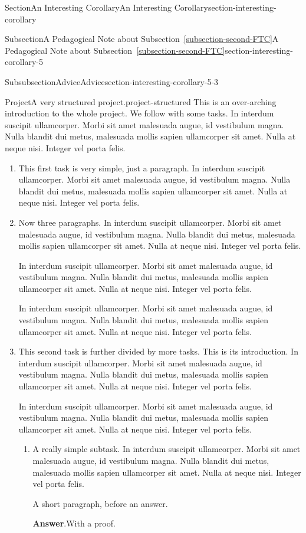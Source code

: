 \documentclass[twoside,10pt,]{article}
\newcommand{\blocktitlefont}{\relax}
\newcommand{\xreffont}{\relax}
\numberwithin{equation}{section}
\begin{document}
\begin{sectionptx}{Section}{An Interesting Corollary}{}{An Interesting Corollary}{}{}{section-interesting-corollary}
\begin{subsectionptx}{Subsection}{A Pedagogical Note about Subsection~{\xreffont\ref*{subsection-second-FTC}}}{}{A Pedagogical Note about Subsection~{\xreffont\ref*{subsection-second-FTC}}}{}{}{section-interesting-corollary-5}
\begin{subsubsectionptx}{Subsubsection}{Advice}{}{Advice}{}{}{section-interesting-corollary-5-3}
\begin{project}{Project}{A very structured project.}{project-structured}
This is an over-arching introduction to the whole project.  We follow with some tasks.  In interdum suscipit ullamcorper. Morbi sit amet malesuada augue, id vestibulum magna. Nulla blandit dui metus, malesuada mollis sapien ullamcorper sit amet. Nulla at neque nisi. Integer vel porta felis.%
\begin{enumerate}[font=\bfseries,label=(\alph*),ref=\alph*]%
\item{}This first task is very simple, just a paragraph.  In interdum suscipit ullamcorper. Morbi sit amet malesuada augue, id vestibulum magna. Nulla blandit dui metus, malesuada mollis sapien ullamcorper sit amet. Nulla at neque nisi. Integer vel porta felis.%
\item{}Now three paragraphs.  In interdum suscipit ullamcorper. Morbi sit amet malesuada augue, id vestibulum magna. Nulla blandit dui metus, malesuada mollis sapien ullamcorper sit amet. Nulla at neque nisi. Integer vel porta felis.%
\par
In interdum suscipit ullamcorper. Morbi sit amet malesuada augue, id vestibulum magna. Nulla blandit dui metus, malesuada mollis sapien ullamcorper sit amet. Nulla at neque nisi. Integer vel porta felis.%
\par
In interdum suscipit ullamcorper. Morbi sit amet malesuada augue, id vestibulum magna. Nulla blandit dui metus, malesuada mollis sapien ullamcorper sit amet. Nulla at neque nisi. Integer vel porta felis.%
\item{}This second task is further divided by more tasks.  This is its introduction.  In interdum suscipit ullamcorper. Morbi sit amet malesuada augue, id vestibulum magna. Nulla blandit dui metus, malesuada mollis sapien ullamcorper sit amet. Nulla at neque nisi. Integer vel porta felis.%
\par
In interdum suscipit ullamcorper. Morbi sit amet malesuada augue, id vestibulum magna. Nulla blandit dui metus, malesuada mollis sapien ullamcorper sit amet. Nulla at neque nisi. Integer vel porta felis.%
\begin{enumerate}[font=\bfseries,label=(\roman*),ref=\theenumi.\roman*]%
\item{}A really simple subtask.  In interdum suscipit ullamcorper. Morbi sit amet malesuada augue, id vestibulum magna. Nulla blandit dui metus, malesuada mollis sapien ullamcorper sit amet. Nulla at neque nisi. Integer vel porta felis.%
\par
A short paragraph, before an answer.%
\par\smallskip%
\noindent\textbf{\blocktitlefont Answer}.\hypertarget{project-structured-6-2-2}{}\quad{}With a proof.%

\end{enumerate}
\end{enumerate}
\end{project}
\end{subsubsectionptx}
\end{subsectionptx}
\end{sectionptx}
\end{document}
